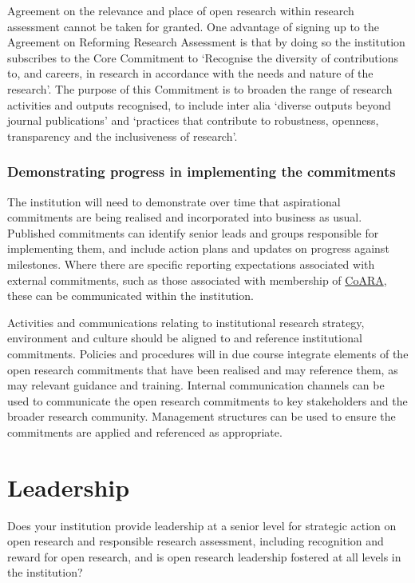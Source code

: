 \documentclass[
  letterpaper,
  DIV=11,
  numbers=noendperiod,
  oneside]{scrreprt}
\begin{document}
Agreement on the relevance and place of open research within research
assessment cannot be taken for granted. One advantage of signing up to
the Agreement on Reforming Research Assessment is that by doing so the
institution subscribes to the Core Commitment to `Recognise the
diversity of contributions to, and careers, in research in accordance
with the needs and nature of the research'. The purpose of this
Commitment is to broaden the range of research activities and outputs
recognised, to include inter alia `diverse outputs beyond journal
publications' and `practices that contribute to robustness, openness,
transparency and the inclusiveness of research'.

\subsection{Demonstrating progress in implementing the
commitments}\label{demonstrating-progress-in-implementing-the-commitments}

The institution will need to demonstrate over time that aspirational
commitments are being realised and incorporated into business as usual.
Published commitments can identify senior leads and groups responsible
for implementing them, and include action plans and updates on progress
against milestones. Where there are specific reporting expectations
associated with external commitments, such as those associated with
membership of \href{https://coara.eu/agreement/action-plan/}{CoARA},
these can be communicated within the institution.

Activities and communications relating to institutional research
strategy, environment and culture should be aligned to and reference
institutional commitments. Policies and procedures will in due course
integrate elements of the open research commitments that have been
realised and may reference them, as may relevant guidance and training.
Internal communication channels can be used to communicate the open
research commitments to key stakeholders and the broader research
community. Management structures can be used to ensure the commitments
are applied and referenced as appropriate.


\chapter{Leadership}\label{leadership}

\begin{tcolorbox}[enhanced jigsaw, colback=white, toprule=.15mm, colframe=quarto-callout-color-frame, arc=.35mm, opacityback=0, bottomrule=.15mm, breakable, left=2mm, leftrule=.75mm, rightrule=.15mm]

Does your institution provide leadership at a senior level for strategic
action on open research and responsible research assessment, including
recognition and reward for open research, and is open research
leadership fostered at all levels in the institution?

\end{tcolorbox}
\end{document}
